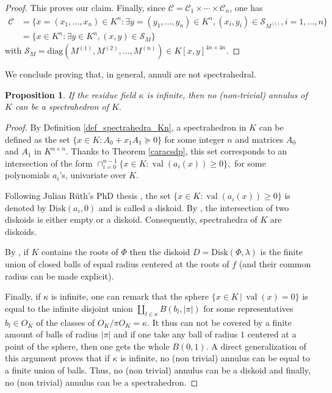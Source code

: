 \documentclass[a4paper,oneside,10pt]{article}
\newtheorem{proposition}[theorem]{Proposition}
\DeclareMathOperator{\val}{val}
\def\diag{\mathrm{diag}}
\begin{document}
\begin{proof}
This proves our claim.
Finally, since $\mathcal{C} = \mathcal{C}_1 \times \cdots \times \mathcal{C}_n$, one has
\begin{equation*}
  \begin{aligned}
    \mathcal{C} &=
    \{x=(x_1,\ldots,x_n) \in K^n : \exists y = (y_1,\ldots,y_n) \in K^n, (x_i,y_i) \in
    \mathcal{S}_{M^{(i)}}, i=1,\ldots,n\} \\
    &= \{x \in K^n : \exists y \in K^n, (x,y) \in \mathcal{S}_M\}
  \end{aligned}
\end{equation*}
with $\mathcal{S}_M = \diag\left(M^{(1)}, M^{(2)}, \ldots, M^{(n)}\right) \in K[x,y]^{4n \times 4n}.$
\end{proof}

We conclude proving that, in general, annuli are not spectrahedral.

\begin{proposition}
If the residue field $\kappa$ is infinite, then no (non-trivial) annulus of $K$ can be a spectrahedron of $K.$
\end{proposition}
\begin{proof}
By Definition \ref{def_spectrahedra_Kn}, a spectrahedron in $K$ 
can be defined as the set $\{x \in K : A_0+x_1A_1 \succeq 0\}$
for some integer $n$ and matrices $A_0$ and $A_1$ in $K^{n \times n}$.
Thanks to Theorem \ref{caracsdp},
this set corresponds to an intersection of the form
$\cap_{i=0}^{n-1} \{ x \in K : \val(a_i(x)) \geq 0 \},$
for some polynomials $a_i$'s, univariate over $K$.

Following Julian Rüth's PhD thesis \cite{ruth_models_2015},
the set $\{ x \in K : \val(a_i(x)) \geq 0 \}$
is denoted by $\textrm{Disk}(a_i,0)$ and is called 
a diskoid.
By \cite[Lemma 4.44]{ruth_models_2015}, the intersection
of two diskoids is either empty or a diskoid.
Consequently, spectrahedra of $K$ are diskoids.

By \cite[Lemma 4.43]{ruth_models_2015}, if $K$
contains the roots of $\Phi$ then the diskoid
$D=\textrm{Disk}(\Phi, \lambda)$ is the finite union
of closed balls of equal radius centered at the roots of $f$ (and their common radius can be made explicit).

Finally, if $\kappa$ is infinite, one can remark that the sphere
$\{x \in K \,|\,  \val(x) =0\}$ is equal to the infinite disjoint union $\amalg_{l \in \kappa} B(b_l, \vert \pi \vert)$ for some 
representatives $b_l \in O_K$ of the classes of $O_K / \pi O_K=\kappa.$
It thus can not be covered by a finite amount of balls of radius $\vert \pi \vert$
and if one take any ball of radius $1$ centered at a point of the sphere, then one gets the whole
$B(0,1).$
A direct generalization of this argument proves that
if $\kappa$ is infinite, no (non trivial) annulus can be equal to
a finite union of balls. Thus, no (non trivial) annulus can be a diskoid and finally, no (non trivial) annulus can be a spectrahedron.
\end{proof}
\end{document}
